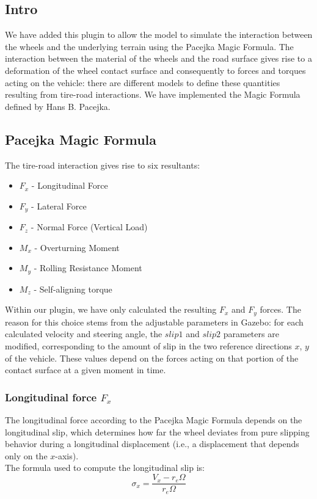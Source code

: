 \subsection{Intro}

We have added this plugin to allow the model to simulate the interaction between the wheels and the underlying terrain using the Pacejka Magic Formula.
The interaction between the material of the wheels and the road surface gives rise to a deformation of the wheel contact surface and consequently to forces and torques acting on the vehicle: there are different models to define these quantities resulting from tire-road interactions. We have implemented the Magic Formula defined by Hans B. Pacejka.



\subsection{Pacejka Magic Formula}
The tire-road interaction gives rise to six resultants:
\begin{itemize}
	\item $F_x$ - Longitudinal Force
	\item $F_y$ - Lateral Force
	\item $F_z$ - Normal Force (Vertical Load)
	\item $M_x$ - Overturning Moment
	\item $M_y$ - Rolling Resistance Moment
	\item $M_z$ - Self-aligning torque
\end{itemize}
Within our plugin, we have only calculated the resulting $F_x$ and $F_y$ forces. The reason for this choice stems from the adjustable parameters in Gazebo: for each calculated velocity and steering angle, the $slip1$ and $slip2$ parameters are modified, corresponding to the amount of slip in the two reference directions $x$, $y$ of the vehicle. These values depend on the forces acting on that portion of the contact surface at a given moment in time.

\subsubsection{Longitudinal force $F_x$}
The longitudinal force according to the Pacejka Magic Formula depends on the longitudinal slip, which determines how far the wheel deviates from pure slipping behavior during a longitudinal displacement (i.e., a displacement that depends only on the $x$-axis).
\\
The formula used to compute the longitudinal slip is:
\[
\sigma_x =
	\frac{V_x - r_e\Omega}{r_e\Omega}
\] \\

